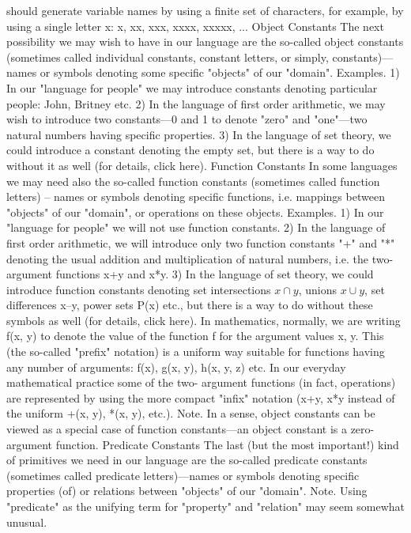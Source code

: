 should generate variable names by using a finite set of characters, for example, by using a single letter x:
x, xx, xxx, xxxx, xxxxx, ...
Object Constants
The next possibility we may wish to have in our language are the so-called object constants (sometimes
called individual constants, constant letters, or simply, constants)---names or symbols denoting some
specific "objects" of our "domain".
Examples. 1) In our "language for people" we may introduce constants denoting particular people: John, Britney etc.
2) In the language of first order arithmetic, we may wish to introduce two constants---0 and 1 to denote "zero" and "one"---two
natural numbers having specific properties.
3) In the language of set theory, we could introduce a constant denoting the empty set, but there is a way to do without it as
well (for details, click here).
Function Constants
In some languages we may need also the so-called function constants (sometimes called function letters)
– names or symbols denoting specific functions, i.e. mappings between "objects" of our "domain", or
operations on these objects.
Examples. 1) In our "language for people" we will not use function constants.
2) In the language of first order arithmetic, we will introduce only two function constants "+" and "*" denoting the usual
addition and multiplication of natural numbers, i.e. the two-argument functions x+y and x*y.
3) In the language of set theory, we could introduce function constants denoting set intersections \(x\cap y\), unions \(x\cup y\), set
differences x–y, power sets P(x) etc., but there is a way to do without these symbols as well (for details, click here).
In mathematics, normally, we are writing f(x, y) to denote the value of the function f for the argument
values x, y. This (the so-called "prefix" notation) is a uniform way suitable for functions having any
number of arguments: f(x), g(x, y), h(x, y, z) etc. In our everyday mathematical practice some of the two-
argument functions (in fact, operations) are represented by using the more compact "infix" notation (x+y,
x*y instead of the uniform +(x, y), *(x, y), etc.).
Note. In a sense, object constants can be viewed as a special case of function constants---an object
constant is a zero-argument function.
Predicate Constants
The last (but the most important!) kind of primitives we need in our language are the so-called predicate
constants (sometimes called predicate letters)---names or symbols denoting specific properties (of) or
relations between "objects" of our "domain".
Note. Using "predicate" as the unifying term for "property" and "relation" may seem somewhat unusual.
